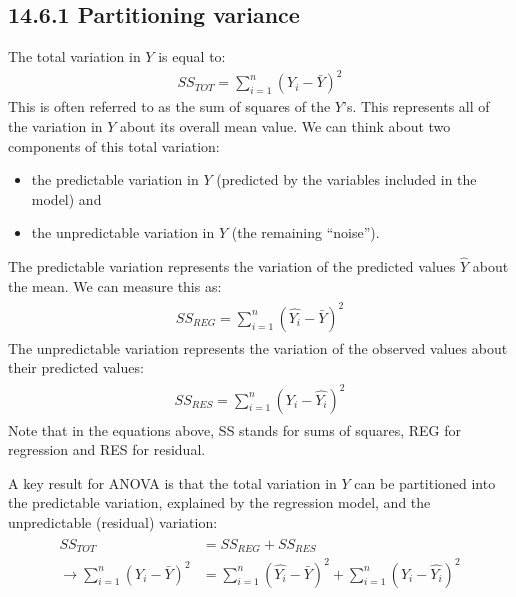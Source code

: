 \documentclass[letterpaper,10pt,english]{jupyterBook}
\begin{document}
\subsection{14.6.1 Partitioning variance}
\label{\detokenize{14.g. Linear Regression III:partitioning-variance}}
\sphinxAtStartPar
The total variation in \(Y\) is equal to:
\begin{equation*}
\begin{split} 
SS_{TOT} = \sum_{i=1}^n (Y_i-\bar{Y})^2
\end{split}
\end{equation*}
\sphinxAtStartPar
This is often referred to as the sum of squares of the \(Y\)’s. This represents all of the variation in \(Y\) about its overall mean value. We can think about two components of this total variation:
\begin{itemize}
\item {} 
\sphinxAtStartPar
the predictable variation in \(Y\) (predicted by the variables included in the model) and

\item {} 
\sphinxAtStartPar
the unpredictable variation in \(Y\) (the remaining “noise”).

\end{itemize}

\sphinxAtStartPar
The predictable variation represents the variation of the predicted values \(\hat{Y}\) about the mean. We can measure this as:
\begin{equation*}
\begin{split}
\begin{align}
SS_{REG}= \sum_{i=1}^n (\hat{Y_i}-\bar{Y})^2 
\end{align}
\end{split}
\end{equation*}
\sphinxAtStartPar
The unpredictable variation represents the variation of the observed values about their predicted values:
\begin{equation*}
\begin{split}
\begin{align}
SS_{RES} =  \sum_{i=1}^n(Y_i-\hat{Y_i})^2
\end{align}
\end{split}
\end{equation*}
\sphinxAtStartPar
Note that in the equations above, SS stands for sums of squares, REG for regression and RES for residual.

\sphinxAtStartPar
A key result for ANOVA is that the total variation in \(Y\) can be partitioned into the predictable variation, explained by the regression model, and the unpredictable (residual) variation:
\begin{equation*}
\begin{split}
\begin{align}
SS_{TOT} &= SS_{REG}+SS_{RES} \\
\rightarrow \sum_{i=1}^n (Y_i-\bar{Y})^2 &= \sum_{i=1}^n (\hat{Y_i}-\bar{Y})^2 + \sum_{i=1}^n(Y_i-\hat{Y_i})^2
\end{align}
\end{split}
\end{equation*}
\end{document}
